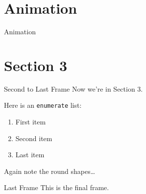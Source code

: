
\section{Animation}



\begin{frame}{Animation}
    \pause 
\end{frame}




\section{Section 3}

\begin{frame}{Second to Last Frame}
    Now we're in Section 3.

    Here is an \texttt{enumerate} list:
    \begin{enumerate}
        \item
        First item

        \item
        Second item

        \item
        Last item
    \end{enumerate}
    Again note the round shapes\dots
\end{frame}

\begin{frame}{Last Frame}
    This is the final frame.
\end{frame}



\thanksframe
